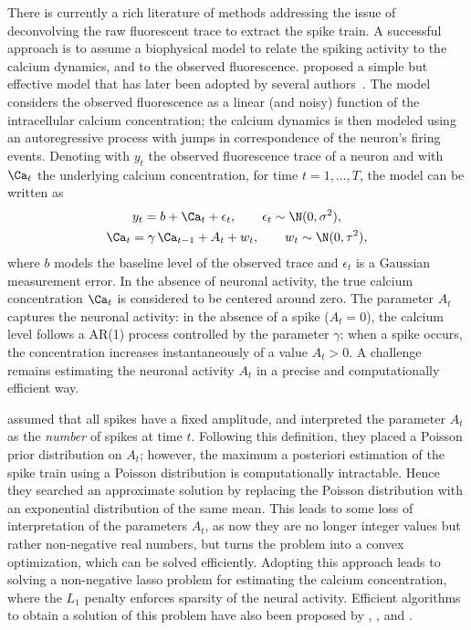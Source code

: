 There is currently a rich literature of methods addressing the issue of deconvolving the raw fluorescent trace to extract the spike train. A successful approach is to assume a biophysical model to relate the spiking activity to the calcium dynamics, and to the observed fluorescence. \textcite{vogelstein2010} proposed a simple but effective model that has later been adopted by several authors~\parencite{pnevmatikakis2016, friedrich2016, friedrich2017, jewell2018, jewell2019}. The model considers the observed fluorescence as a linear (and noisy) function of the intracellular calcium concentration; the calcium dynamics is then modeled using an autoregressive process with jumps in correspondence of the neuron's firing events.
Denoting with $y_t$ the observed fluorescence trace of a neuron and with $\Ca_t$ the underlying calcium concentration, for time $t=1,\dots,T$, the model can be written as
\begin{equation}
\begin{gathered}
y_t = b + \Ca_t + \epsilon_t,\qquad \epsilon_t \sim \N(0,\sigma^2),  \\
\Ca_t = \gamma\, \Ca_{t-1} + A_t + w_t, \qquad w_t \sim \N(0, \tau^2),
\end{gathered}
\label{ch1_eq:armodel}
\end{equation}
where $b$ models the baseline level of the observed trace and $\epsilon_t$ is a Gaussian measurement error. In the absence of neuronal activity, the true calcium concentration $\Ca_t$ is considered to be centered around zero. The parameter $A_t$ captures the neuronal activity: in the absence of a spike ($A_t = 0$), the calcium level follows a AR(1) process controlled by the parameter $\gamma$; when a spike occurs, the concentration increases instantaneously of a value $A_t > 0$.
A challenge remains estimating the neuronal activity $A_t$ in a precise and computationally efficient way.

\textcite{vogelstein2010} assumed that all spikes have a fixed amplitude, and interpreted the parameter $A_t$ as the \textit{number} of spikes at time $t$. Following this definition, they placed a Poisson prior distribution on $A_t$; however, the maximum a posteriori estimation of the spike train using a Poisson distribution is computationally intractable. Hence they searched an approximate solution by replacing the Poisson distribution with an exponential distribution of the same mean. This leads to some loss of interpretation of the parameters $A_t$, as now they are no longer integer values but rather non-negative real numbers, but turns the problem into a convex optimization, which can be solved efficiently.
Adopting this approach leads to solving a non-negative lasso problem for estimating the calcium concentration, where the $L_1$ penalty enforces sparsity of the neural activity.
Efficient algorithms to obtain a solution of this problem have also been proposed by \textcite{pnevmatikakis2016}, \textcite{friedrich2016}, and \textcite{friedrich2017}.

